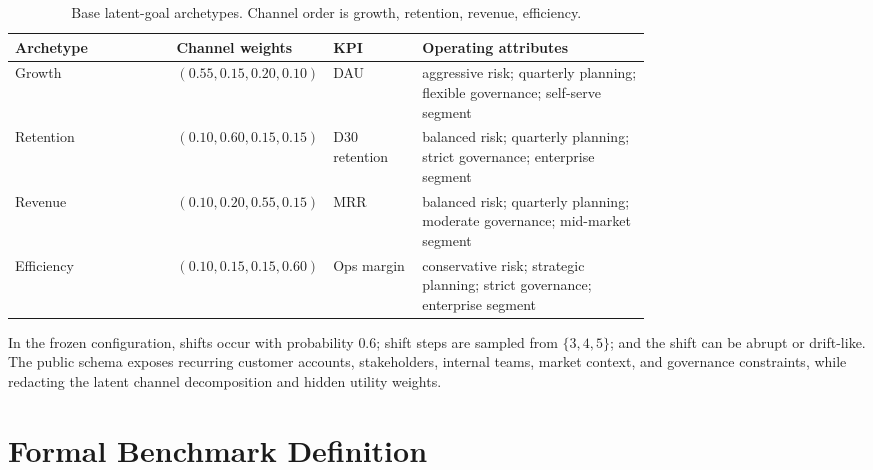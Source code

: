 \begin{table}[!h]
  \centering
  \scriptsize
  \setlength{\tabcolsep}{5pt}
  \begin{tabular}{lp{0.24\linewidth}p{0.14\linewidth}p{0.36\linewidth}}
    \toprule
    Archetype & Channel weights & KPI & Operating attributes \\
    \midrule
    Growth & $(0.55, 0.15, 0.20, 0.10)$ & DAU & aggressive risk; quarterly planning; flexible governance; self-serve segment \\
    Retention & $(0.10, 0.60, 0.15, 0.15)$ & D30 retention & balanced risk; quarterly planning; strict governance; enterprise segment \\
    Revenue & $(0.10, 0.20, 0.55, 0.15)$ & MRR & balanced risk; quarterly planning; moderate governance; mid-market segment \\
    Efficiency & $(0.10, 0.15, 0.15, 0.60)$ & Ops margin & conservative risk; strategic planning; strict governance; enterprise segment \\
    \bottomrule
  \end{tabular}
  \caption{Base latent-goal archetypes. Channel order is growth, retention, revenue, efficiency.}
  \label{tab:archetypes}
\end{table}

In the frozen configuration, shifts occur with probability $0.6$; shift steps
are sampled from $\{3,4,5\}$; and the shift can be abrupt or drift-like. The
public schema exposes recurring customer accounts, stakeholders, internal
teams, market context, and governance constraints, while redacting the latent
channel decomposition and hidden utility weights.

\section{Formal Benchmark Definition}

